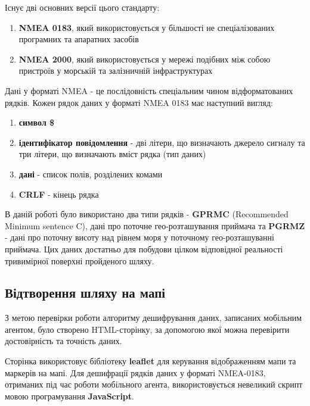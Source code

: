\documentclass[simple,a4paper,14pt,ukrainian,utf8]{eskdtext}
\begin{document}
    Існує дві основних версії цього стандарту:
    
    \begin{enumerate}
    	\item \textbf{NMEA 0183}, який використовується у більшості не спеціалізованих програмних та апаратних засобів
    	\item \textbf{NMEA 2000}, який використовується у мережі подібних між собою пристроїв у морській та залізничній інфраструктурах
    \end{enumerate}
    
    Дані у форматі NMEA - це послідовність спеціальним чином відформатованих рядків. Кожен рядок даних у форматі NMEA 0183 має наступний вигляд:
    
    \begin{enumerate}
    	\item \textbf{символ \$}
		\item \textbf{ідентифікатор повідомлення} - дві літери, що визначають джерело сигналу та три літери, що визначають вміст рядка (тип даних)
		\item \textbf{дані} - список полів, розділених комами
		\item \textbf{CRLF} - кінець рядка
    \end{enumerate}
    
    В даній роботі було використано два типи рядків - \textbf{GPRMC} (Recommended Minimum sentence C), дані про поточне гео-розташування приймача та \textbf{PGRMZ} - дані про поточну висоту над рівнем моря у поточному гео-розташуванні приймача. Цих даних достатньо для побудови цілком відповідної реальності тривимірної поверхні пройденого шляху.

	\newpage
	
    \subsection{Відтворення шляху на мапі}
    
    З метою перевірки роботи алгоритму дешифрування даних, записаних мобільним агентом, було створено HTML-сторінку, за допомогою якої можна перевірити достовірність та точність даних.
    
    Сторінка використовує бібліотеку \textbf{leaflet} для керування відображенням мапи та маркерів на мапі. Для дешифрації рядків даних у форматі NMEA-0183, отриманих під час роботи мобільного агента, використовується невеликий скрипт мовою програмування \textbf{JavaScript}.
    
\end{document}
